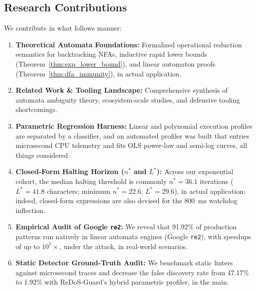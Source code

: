\documentclass{ieeeaccess}
\begin{document}
\subsection{Research Contributions}
We contribute in what follows manner:
\begin{enumerate}
    \item \textbf{Theoretical Automata Foundations:} Formalized operational reduction semantics for backtracking NFAs, inductive rapid lower bounds (Theorem~\ref{thm:exp_lower_bound}), and linear automaton proofs (Theorem~\ref{thm:dfa_immunity}), in actual application.
    \item \textbf{Related Work \& Tooling Landscape:} Comprehensive synthesis of automata ambiguity theory, ecosystem-scale studies, and defensive tooling shortcomings.
    \item \textbf{Parametric Regression Harness:} Linear and polynomial execution profiles are separated by a classifier, and an automated profiler was built that entries microsecond CPU telemetry and fits OLS power-law and semi-log curves, all things considered.
    \item \textbf{Closed-Form Halting Horizon ($n^*$ and $L^*$):} Across our exponential cohort, the median halting threshold is commonly $n^* = 36.1$ iterations ($L^* = 41.8$ characters; minimum $n^* = 22.6$, $L^* = 29.6$), in actual application; indeed, closed-form expressions are also devised for the 800~ms watchdog inflection.
    \item \textbf{Empirical Audit of Google \texttt{re2}:} We reveal that 91.92\% of production patterns run natively in linear automata engines (Google \texttt{re2}), with speedups of up to $10^5\times$, under the attack, in real-world scenarios.
    \item \textbf{Static Detector Ground-Truth Audit:} We benchmark static linters against microsecond traces and decrease the false discovery rate from 47.17\% to 1.92\% with ReDoS-Guard's hybrid parametric profiler, in the main.
\end{enumerate}
\end{document}
